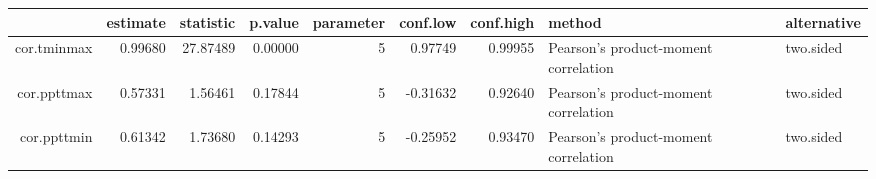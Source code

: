 \begin{table}[ht]
\centering
\begin{tabular}{rrrrrrrll}
  \hline
 & estimate & statistic & p.value & parameter & conf.low & conf.high & method & alternative \\ 
  \hline
cor.tminmax & 0.99680 & 27.87489 & 0.00000 &      5 & 0.97749 & 0.99955 & Pearson's product-moment correlation & two.sided \\ 
  cor.ppttmax & 0.57331 & 1.56461 & 0.17844 &      5 & -0.31632 & 0.92640 & Pearson's product-moment correlation & two.sided \\ 
  cor.ppttmin & 0.61342 & 1.73680 & 0.14293 &      5 & -0.25952 & 0.93470 & Pearson's product-moment correlation & two.sided \\ 
   \hline
\end{tabular}
\end{table}
